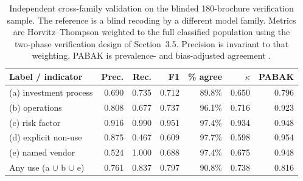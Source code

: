 \documentclass[utf8]{FrontiersinHarvard}
\begin{document}
\begin{table}[h!]
\caption{Independent cross-family validation on the blinded 180-brochure verification sample. The reference is a blind recoding by a different model family. Metrics are Horvitz--Thompson weighted to the full classified population using the two-phase verification design of Section~3.5. Precision is invariant to that weighting. PABAK is prevalence- and bias-adjusted agreement \citep{byrt1993}.}
\label{tab:validation}
\centering
\small
\begin{tabular}{lrrrrrr}
\toprule
Label / indicator & Prec. & Rec. & F1 & \% agree & $\kappa$ & PABAK \\
\midrule
(a) investment process & 0.690 & 0.735 & 0.712 & 89.8\% & 0.650 & 0.796 \\
(b) operations & 0.808 & 0.677 & 0.737 & 96.1\% & 0.716 & 0.923 \\
(c) risk factor & 0.916 & 0.990 & 0.951 & 97.4\% & 0.934 & 0.948 \\
(d) explicit non-use & 0.875 & 0.467 & 0.609 & 97.7\% & 0.598 & 0.954 \\
(e) named vendor & 0.524 & 1.000 & 0.688 & 97.4\% & 0.675 & 0.948 \\
Any use (a $\cup$ b $\cup$ e) & 0.761 & 0.837 & 0.797 & 90.8\% & 0.738 & 0.816 \\
\bottomrule
\end{tabular}
\end{table}
\end{document}
